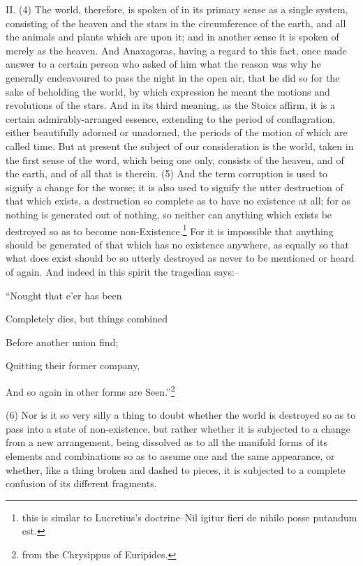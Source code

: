 II. (4) The world, therefore, is spoken of in its primary sense as a single system, consisting of the
heaven and the stars in the circumference of the earth, and all the animals and plants which are
upon it; and in another sense it is spoken of merely as the heaven. And Anaxagoras, having a
regard to this fact, once made answer to a certain person who asked of him what the reason was
why he generally endeavoured to pass the night in the open air, that he did so for the sake of
beholding the world, by which expression he meant the motions and revolutions of the stars. And in
its third meaning, as the Stoics affirm, it is a certain admirably-arranged essence, extending to the
period of conflagration, either beautifully adorned or unadorned, the periods of the motion of which
are called time. But at present the subject of our consideration is the world, taken in the first sense
of the word, which being one only, consists of the heaven, and of the earth, and of all that is
therein. (5) And the term corruption is used to signify a change for the worse; it is also used to
signify the utter destruction of that which exists, a destruction so complete as to have no existence
at all; for as nothing is generated out of nothing, so neither can anything which exists be destroyed
so as to become non-Existence.\footnote{this is similar to Lucretius's doctrine--Nil igitur fieri de nihilo posse putandum
est.} For it is impossible that anything should be generated of that which has no existence
anywhere, as equally so that what does exist should be so utterly destroyed as never to be
mentioned or heard of again. And indeed in this spirit the tragedian says:--

``Nought that e'er has been

Completely dies, but things combined

Before another union find;

Quitting their former company,

And so again in other forms are Seen.''\footnote{from the Chrysippus of Euripides.}

(6) Nor is it so very silly a thing to doubt whether the world is destroyed so as to pass into a state
of non-existence, but rather whether it is subjected to a change from a new arrangement, being
dissolved as to all the manifold forms of its elements and combinations so as to assume one and
the same appearance, or whether, like a thing broken and dashed to pieces, it is subjected to a
complete confusion of its different fragments.

